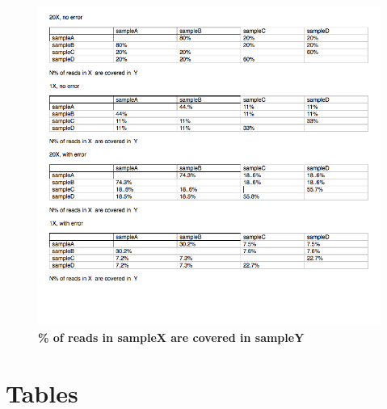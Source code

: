 \documentclass[10pt]{article}
\begin{document}
\begin{figure}[!ht]
\centerline{\includegraphics[width=8in]{./figure/figure1}}
\caption{\bf \% of reads in sampleX are covered in sampleY }
\label{fig:figure1}
\end{figure}


\section*{Tables}
\end{document}
